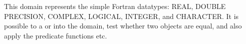 
This domain represents the simple Fortran datatypes: REAL, DOUBLE PRECISION,
COMPLEX, LOGICAL, INTEGER, and CHARACTER.
It is possible to  a  or 
into the domain, test whether two objects are equal, and also apply
the predicate functions  etc.


